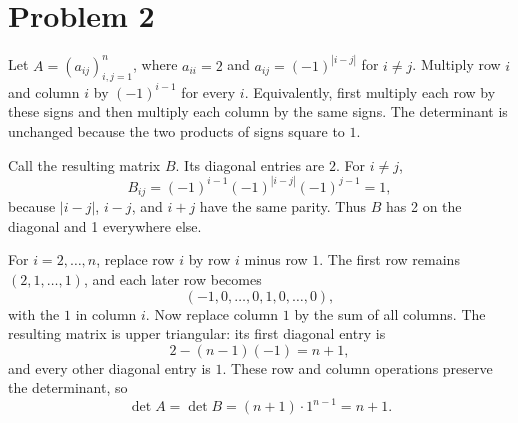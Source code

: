 \documentclass[11pt]{article}
\begin{document}
\section*{Problem 2}

Let $A=(a_{ij})_{i,j=1}^n$, where $a_{ii}=2$ and
$a_{ij}=(-1)^{|i-j|}$ for $i\ne j$. Multiply row $i$ and column $i$
by $(-1)^{i-1}$ for every $i$. Equivalently, first multiply each row
by these signs and then multiply each column by the same signs. The
determinant is unchanged because the two products of signs square to
$1$.

Call the resulting matrix $B$. Its diagonal entries are $2$. For
$i\ne j$,
\[
B_{ij}=(-1)^{i-1}(-1)^{|i-j|}(-1)^{j-1}=1,
\]
because $|i-j|$, $i-j$, and $i+j$ have the same parity. Thus $B$ has
2 on the diagonal and 1 everywhere else.

For $i=2,\ldots,n$, replace row $i$ by row $i$ minus row $1$. The
first row remains $(2,1,\ldots,1)$, and each later row becomes
\[
(-1,0,\ldots,0,1,0,\ldots,0),
\]
with the $1$ in column $i$. Now replace column $1$ by the sum of all
columns. The resulting matrix is upper triangular: its first diagonal
entry is
\[
2-(n-1)(-1)=n+1,
\]
and every other diagonal entry is $1$. These row and column operations
preserve the determinant, so
\[
\boxed{\det A=\det B=(n+1)\cdot1^{n-1}=n+1.}
\]
\end{document}
